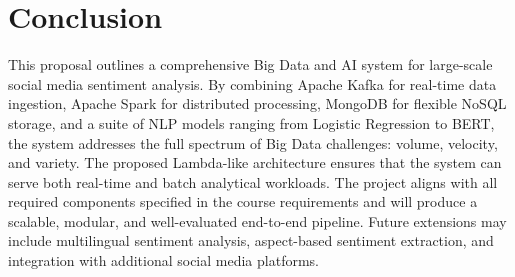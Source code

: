 \documentclass[conference]{IEEEtran}
\begin{document}
\section{Conclusion}
This proposal outlines a comprehensive Big Data and AI system for large-scale social media sentiment analysis. By combining Apache Kafka for real-time data ingestion, Apache Spark for distributed processing, MongoDB for flexible NoSQL storage, and a suite of NLP models ranging from Logistic Regression to BERT, the system addresses the full spectrum of Big Data challenges: volume, velocity, and variety. The proposed Lambda-like architecture ensures that the system can serve both real-time and batch analytical workloads. The project aligns with all required components specified in the course requirements and will produce a scalable, modular, and well-evaluated end-to-end pipeline. Future extensions may include multilingual sentiment analysis, aspect-based sentiment extraction, and integration with additional social media platforms.
\end{document}
